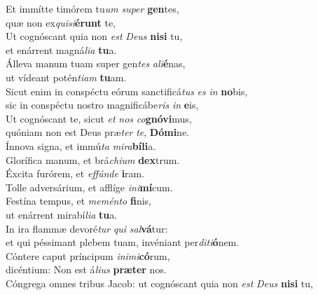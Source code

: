 \evenverse Et immítte timórem tu\textit{um} \textit{su}\textit{per} \textbf{gen}tes,~\*\\
\evenverse quæ non ex\textit{qui}\textit{si}\textbf{é}\textbf{runt} te,\\
\oddverse Ut cognóscant quia non \textit{est} \textit{De}\textit{us} \textbf{ni}\textbf{si} tu,~\*\\
\oddverse et enárrent magná\textit{li}\textit{a} \textbf{tu}a.\\
\evenverse Álleva manum tuam super gen\textit{tes} \textit{a}\textit{li}\textbf{é}nas,~\*\\
\evenverse ut vídeant potén\textit{ti}\textit{am} \textbf{tu}am.\\
\oddverse Sicut enim in conspéctu eórum sanctificá\textit{tus} \textit{es} \textit{in} \textbf{no}bis,~\*\\
\oddverse sic in conspéctu nostro magnificábe\textit{ris} \textit{in} \textbf{e}is,\\
\evenverse Ut cognóscant te, sicut \textit{et} \textit{nos} \textit{co}\textbf{gnó}\textbf{vi}mus,~\*\\
\evenverse quóniam non est Deus præ\textit{ter} \textit{te}, \textbf{Dó}\textbf{mi}ne.\\
\oddverse Ínnova signa, et immú\textit{ta} \textit{mi}\textit{ra}\textbf{bí}\textbf{li}a.~\*\\
\oddverse Glorífica manum, et brá\textit{chi}\textit{um} \textbf{dex}trum.\\
\evenverse Éxcita furórem, et \textit{ef}\textit{fún}\textit{de} \textbf{i}ram.~\*\\
\evenverse Tolle adversárium, et afflíge \textit{i}\textit{ni}\textbf{mí}cum.\\
\oddverse Festína tempus, et \textit{me}\textit{mén}\textit{to} \textbf{fi}nis,~\*\\
\oddverse ut enárrent mirabí\textit{li}\textit{a} \textbf{tu}a.\\
\evenverse In ira flammæ devoré\textit{tur} \textit{qui} \textit{sal}\textbf{vá}tur:~\*\\
\evenverse et qui péssimant plebem tuam, invéniant per\textit{di}\textit{ti}\textbf{ó}nem.\\
\oddverse Cóntere caput príncipum \textit{i}\textit{ni}\textit{mi}\textbf{có}rum,~\*\\
\oddverse dicéntium: Non est á\textit{li}\textit{us} \textbf{præ}\textbf{ter} nos.\\
\evenverse Cóngrega omnes tribus Jacob: ut cognóscant quia non \textit{est} \textit{De}\textit{us} \textbf{ni}\textbf{si} tu,~\*\\
